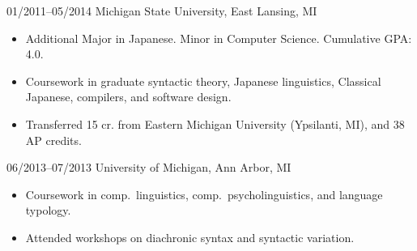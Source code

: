 \documentclass[10pt,oneside]{article}
\begin{document}
\topheading


\begin{reslist}
		{01/2011--05/2014}
		{Michigan State University, East Lansing, MI}
		{}
	\begin{itemize}
		\item Additional Major in Japanese. Minor in Computer Science. Cumulative GPA: 4.0.
		\item Coursework in graduate syntactic theory, Japanese linguistics, Classical Japanese, compilers, and software design.
		\item Transferred 15 cr. from Eastern Michigan University (Ypsilanti, MI), and 38 AP credits.
	\end{itemize}
	
		{06/2013--07/2013}
		{University of Michigan, Ann Arbor, MI}
		{}
	\begin{itemize}
		\item Coursework in comp.\ linguistics, comp.\ psycholinguistics, and language typology.
		\item Attended workshops on diachronic syntax and syntactic variation.
	\end{itemize}
\end{reslist}


\end{document}
